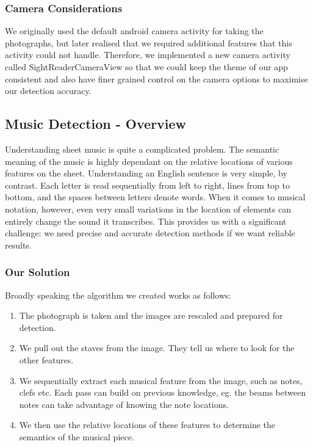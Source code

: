 \subsubsection{Camera Considerations}
We originally used the default android camera activity for taking the photographs, but later realised that we required additional features that this activity could not handle. Therefore, we implemented a new camera activity called SightReaderCameraView so that we could keep the theme of our app consistent and also have finer grained control on the camera options to maximise our detection accuracy.

\subsection{Music Detection - Overview}
Understanding sheet music is quite a complicated problem. The semantic meaning of the music is highly dependant on the relative locations of various features on the sheet. Understanding an English sentence is very simple, by contrast. Each letter is read sequentially from left to right, lines from top to bottom, and the spaces between letters denote words. When it comes to musical notation, however, even very small variations in the location of elements can entirely change the sound it
transcribes. This provides us with a significant challenge: we need precise and accurate detection methods if we want reliable results.

\subsubsection{Our Solution}

Broadly speaking the algorithm we created works as follows: 

\begin{enumerate}
\item{The photograph is taken and the images are rescaled and prepared for detection.}
\item{We pull out the staves from the image. They tell us where to look for the other features.}
\item{We sequentially extract each musical feature from the image, such as notes, clefs etc. Each pass can build on previous knowledge, eg. the beams between notes can take advantage of knowing the note locations.}
\item{We then use the relative locations of these features to determine the semantics of the musical piece.}
\end{enumerate}

